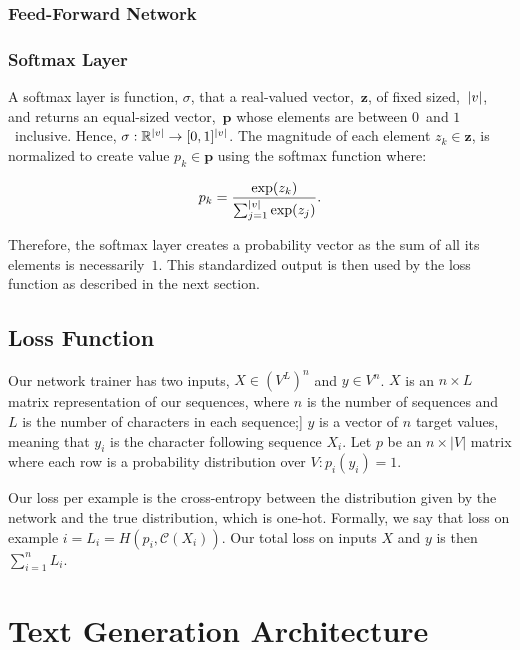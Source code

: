 \documentclass{article}
\DeclarePairedDelimiter\abs{\lvert}{\rvert}%
\begin{document}
\subsubsection{Feed-Forward Network}


\subsubsection{Softmax Layer}

A softmax layer is function, $\sigma$, that a real-valued vector,~$\mathbf{z}$, of fixed sized,~$\abs{v}$, and returns an equal-sized vector,~$\mathbf{p}$ whose elements are between $0$~and $1$~inclusive.  Hence, $\sigma : \mathbb{R}^{\abs{v}} \rightarrow [0,1]^{\abs{v}}$.  The magnitude of each element $z_k \in \mathbf{z}$, is normalized to create value $p_k \in \mathbf{p}$ using the softmax function where:

\begin{equation}
  p_k = \frac{\exp(z_k)}{\sum_{j=1}^{\abs{v}} \exp(z_j)}\textrm{.}
\end{equation}

Therefore, the softmax layer creates a probability vector as the sum of all its elements is necessarily~$1$. This standardized output is then used by the loss function as described in the next section.

\subsection{Loss Function}


Our network trainer has two inputs, $X \in (V^L)^n$ and $y \in V^n$. $X$ is an $n \times L$ matrix representation of our sequences, where $n$ is the number of sequences and $L$ is the number of characters in each sequence;] $y$ is a vector of $n$ target values, meaning that $y_i$ is the character following sequence $X_i$. Let $p$ be an $n \times |V|$ matrix where each row is a probability distribution over $V : p_i(y_i) = 1$.

Our loss per example is the cross-entropy between the distribution given by the network and the true distribution, which is one-hot. Formally, we say that loss on example $i = L_i = H(p_i, \mathcal{C}(X_i))$. Our total loss on inputs $X$ and $y$ is then $\sum_{i=1}^{n} L_i$.


\section{Text Generation Architecture}
\end{document}
